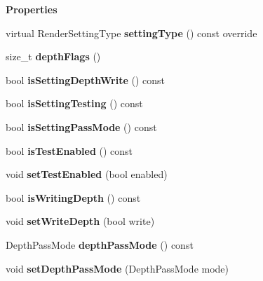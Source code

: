 \begin{Indent}\textbf{ Properties}\par
\begin{DoxyCompactItemize}
\item 
\mbox{\label{classrev_1_1_depth_setting_a9391789dd57e5cd18afe31a9e745729a}} 
virtual Render\+Setting\+Type {\bfseries setting\+Type} () const override
\item 
\mbox{\label{classrev_1_1_depth_setting_aaa62c447a4e2d5ea9b4c9f9ca3fa24d5}} 
size\+\_\+t {\bfseries depth\+Flags} ()
\item 
\mbox{\label{classrev_1_1_depth_setting_ab83059834883df0d095e8136bbe29e33}} 
bool {\bfseries is\+Setting\+Depth\+Write} () const
\item 
\mbox{\label{classrev_1_1_depth_setting_a368eb343d7c2fe37dcdc2ad9ff08ee5f}} 
bool {\bfseries is\+Setting\+Testing} () const
\item 
\mbox{\label{classrev_1_1_depth_setting_a487ba1f17ded6f9407f1b6ebfe56756a}} 
bool {\bfseries is\+Setting\+Pass\+Mode} () const
\item 
\mbox{\label{classrev_1_1_depth_setting_aa4eab2e8aa540237711cc1275bc25aaa}} 
bool {\bfseries is\+Test\+Enabled} () const
\item 
\mbox{\label{classrev_1_1_depth_setting_ab6c1c864a7fe041df592900fe0518a2d}} 
void {\bfseries set\+Test\+Enabled} (bool enabled)
\item 
\mbox{\label{classrev_1_1_depth_setting_a5f3fe8b89e88c99cf03336ed15e24db5}} 
bool {\bfseries is\+Writing\+Depth} () const
\item 
\mbox{\label{classrev_1_1_depth_setting_a31a54671cd6dbece15bfde7b006611cb}} 
void {\bfseries set\+Write\+Depth} (bool write)
\item 
\mbox{\label{classrev_1_1_depth_setting_a6fb5acc25df7d5812463413ff1ca48bb}} 
Depth\+Pass\+Mode {\bfseries depth\+Pass\+Mode} () const
\item 
\mbox{\label{classrev_1_1_depth_setting_a4136af82dadbf194bcec73df9a580d4e}} 
void {\bfseries set\+Depth\+Pass\+Mode} (Depth\+Pass\+Mode mode)
\end{DoxyCompactItemize}
\end{Indent}
